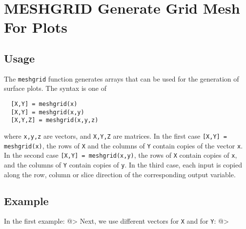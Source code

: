 \section{MESHGRID Generate Grid Mesh For Plots}

\subsection{Usage}

The \verb|meshgrid| function generates arrays that can be used for the
generation of surface plots.  The syntax is one of 
\begin{verbatim}
  [X,Y] = meshgrid(x)
  [X,Y] = meshgrid(x,y)
  [X,Y,Z] = meshgrid(x,y,z)
\end{verbatim}
where \verb|x,y,z| are vectors, and \verb|X,Y,Z| are matrices.  In the first
case \verb|[X,Y] = meshgrid(x)|, the rows of \verb|X| and the columns of \verb|Y|
contain copies of the vector \verb|x|.  In the second case 
\verb|[X,Y] = meshgrid(x,y)|, the rows of \verb|X| contain copies of \verb|x|, and
the columns of \verb|Y| contain copies of \verb|y|.  In the third case, each
input is copied along the row, column or slice direction of the
corresponding output variable.
\subsection{Example}

In the first example:
@>
Next, we use different vectors for \verb|X| and for \verb|Y|:
@>
